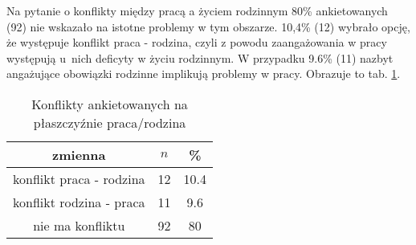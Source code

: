Na pytanie o konflikty między pracą a życiem rodzinnym 80\% ankietowanych (92) nie wskazało na istotne problemy w tym obszarze. 10,4\% (12) wybrało opcję, że występuje konflikt praca - rodzina, czyli z powodu zaangażowania w pracy występują u~nich deficyty w życiu rodzinnym. W przypadku 9.6\% (11) nazbyt angażujące obowiązki rodzinne implikują problemy w pracy. Obrazuje to tab. \ref{tab:Q27}.

\begin{table}[H]
\caption{Konflikty ankietowanych na płaszczyźnie praca/rodzina}
\centering
\begin{tabular}{ | c | c | c |}
\hline
zmienna & $n$ & \% \\
\hline
konflikt praca - rodzina  &  12  & 10.4\\
\hline
konflikt rodzina - praca  &  11  & 9.6 \\
\hline
nie ma konfliktu  &  92  & 80 \\
\hline
\end{tabular}
\label{tab:Q27}
\end{table}
